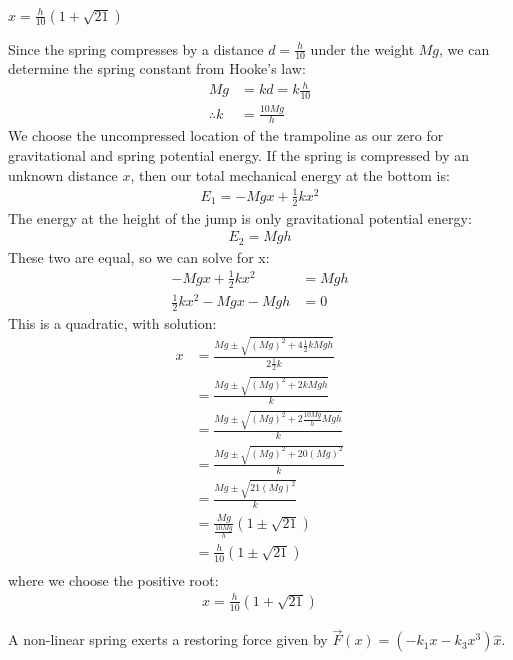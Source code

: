 \begin{finalanswer}
$x = \frac{h}{10}(1 + \sqrt{21})$
\end{finalanswer}
\begin{solution}
Since the spring compresses by a distance $d=\frac{h}{10}$ under the weight $Mg$, we can determine the spring constant from Hooke's law:
\begin{align*}
Mg & = kd=k\frac{h}{10} \\
\therefore k &= \frac{10Mg}{h}
\end{align*}
We choose the uncompressed location of the trampoline as our zero for gravitational and spring potential energy. If the spring is compressed by an unknown distance $x$, then our total mechanical energy at the bottom is:
\begin{align*}
E_1 = -Mgx+\frac{1}{2}kx^2
\end{align*}
The energy at the height of the jump is only gravitational potential energy:
\begin{align*}
E_2 = Mgh
\end{align*}
These two are equal, so we can solve for x:
\begin{align*}
-Mgx+\frac{1}{2}kx^2 &= Mgh\\
\frac{1}{2}kx^2-Mgx-Mgh &=0
\end{align*}
This is a quadratic, with solution:
\begin{align*}
x &= \frac{Mg \pm \sqrt{(Mg)^2+4\frac{1}{2}kMgh}}{2\frac{1}{2}k}\\
&=\frac{Mg \pm \sqrt{(Mg)^2+2kMgh}}{k}\\
&=\frac{Mg \pm \sqrt{(Mg)^2+2\frac{10Mg}{h}Mgh}}{k}\\
&=\frac{Mg \pm \sqrt{(Mg)^2+20(Mg)^2}}{k}\\
&=\frac{Mg \pm \sqrt{21(Mg)^2}}{k}\\
&=\frac{Mg}{\frac{10Mg}{h}}(1 \pm \sqrt{21})\\
&=\frac{h}{10}(1 \pm \sqrt{21})\\
\end{align*}
where we choose the positive root:
\begin{align*}
x = \frac{h}{10}(1 + \sqrt{21})
\end{align*}
\end{solution} 

\question A non-linear spring exerts a restoring force given by $\vec F(x)=(-k_1x-k_3x^3)\hat x$.

